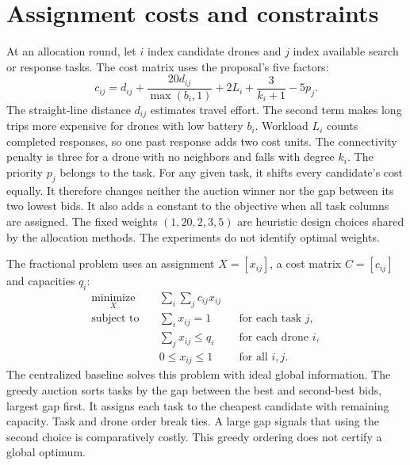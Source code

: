 \section{Assignment costs and constraints}
At an allocation round, let $i$ index candidate drones and $j$ index available search or response tasks. The cost matrix uses the proposal's five factors:
\begin{equation}
c_{ij}=d_{ij}
  + \frac{20d_{ij}}{\max(b_i,1)}
  + 2L_i
  + \frac{3}{k_i+1}
  - 5p_j .
\label{eq:cost}
\end{equation}
The straight-line distance $d_{ij}$ estimates travel effort. The second term makes long trips more expensive for drones with low battery $b_i$. Workload $L_i$ counts completed responses, so one past response adds two cost units. The connectivity penalty is three for a drone with no neighbors and falls with degree $k_i$. The priority $p_j$ belongs to the task. For any given task, it shifts every candidate's cost equally. It therefore changes neither the auction winner nor the gap between its two lowest bids. It also adds a constant to the objective when all task columns are assigned. The fixed weights $(1,20,2,3,5)$ are heuristic design choices shared by the allocation methods. The experiments do not identify optimal weights.

The fractional problem uses an assignment $X=[x_{ij}]$, a cost matrix $C=[c_{ij}]$ and capacities $q_i$:
\begin{equation}
\begin{aligned}
\underset{X}{\operatorname{minimize}}\quad
  &\sum_i\sum_j c_{ij}x_{ij} \\
\text{subject to}\quad
  &\sum_i x_{ij}=1 &&\text{for each task }j,\\
  &\sum_j x_{ij}\le q_i &&\text{for each drone }i,\\
  &0\le x_{ij}\le 1 &&\text{for all }i,j .
\end{aligned}
\label{eq:assignment}
\end{equation}
The centralized baseline solves this problem with ideal global information. The greedy auction sorts tasks by the gap between the best and second-best bids, largest gap first. It assigns each task to the cheapest candidate with remaining capacity. Task and drone order break ties. A large gap signals that using the second choice is comparatively costly. This greedy ordering does not certify a global optimum.


